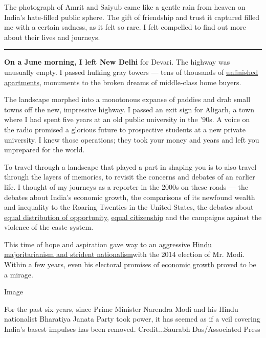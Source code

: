The photograph of Amrit and Saiyub came like a gentle rain from heaven
on India's hate-filled public sphere. The gift of friendship and trust
it captured filled me with a certain sadness, as it felt so rare. I felt
compelled to find out more about their lives and journeys.

\begin{center}\rule{0.5\linewidth}{\linethickness}\end{center}

\textbf{On a June morning, I left New Delhi} for Devari. The highway was
unusually empty. I passed hulking gray towers --- tens of thousands of
\href{https://www.wsj.com/articles/indias-ghost-towns-saddle-middle-class-with-debtand-broken-dreams-11579189678}{unfinished
apartments}, monuments to the broken dreams of middle-class home buyers.

The landscape morphed into a monotonous expanse of paddies and drab
small towns off the new, impressive highway. I passed an exit sign for
Aligarh, a town where I had spent five years at an old public university
in the '90s. A voice on the radio promised a glorious future to
prospective students at a new private university. I knew those
operations; they took your money and years and left you unprepared for
the world.

To travel through a landscape that played a part in shaping you is to
also travel through the layers of memories, to revisit the concerns and
debates of an earlier life. I thought of my journeys as a reporter in
the 2000s on these roads --- the debates about India's economic growth,
the comparisons of its newfound wealth and inequality to the Roaring
Twenties in the United States, the debates about
\href{http://www.sacw.net/index.php?page=imprimir_articulo\&id_article=6295}{equal
distribution of opportunity},
\href{https://caravanmagazine.in/reportage/road-back-ayodhya}{equal
citizenship} and the campaigns against the violence of the caste system.

This time of hope and aspiration gave way to an aggressive
\href{https://www.theguardian.com/books/2014/may/16/what-next-india-pankaj-mishra}{Hindu
majoritarianism and strident nationalism}with the 2014 election of Mr.
Modi. Within a few years, even his electoral promises of
\href{https://www.nytimes.com/2019/02/01/opinion/india-unemployment-jobs-blackout.html}{economic
growth} proved to be a mirage.

Image

For the past six years, since Prime Minister Narendra Modi and his Hindu
nationalist Bharatiya Janata Party took power, it has seemed as if a
veil covering India's basest impulses has been removed. Credit...Saurabh
Das/Associated Press

